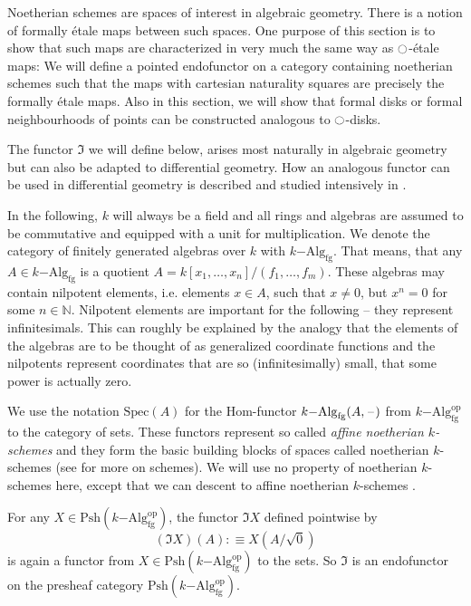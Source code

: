 \documentclass[9pt,twosided]{amsart}
\newcommand{\bN}{\mathbb N}
\newcommand{\Spec}{\ensuremath{\mathrm{Spec}}}
\begin{document}
Noetherian schemes are spaces of interest in algebraic geometry. There is a notion of formally étale maps between such spaces.
One purpose of this section is to show that such maps are characterized in very much the same way as ${\ocircle}$-étale maps:
We will define a pointed endofunctor on a category containing noetherian schemes
such that the maps with cartesian naturality squares are precisely the formally étale maps.
Also in this section, we will show that formal disks or formal neighbourhoods of points can be constructed analogous to ${\ocircle}$-disks.

The functor $\Im$ we will define below, arises most naturally in algebraic geometry but can also be adapted to differential geometry.
How an analogous functor can be used in differential geometry is described and studied intensively in \cite{SyntheticPDEs}.

In the following, $k$ will always be a field and all rings and algebras are assumed to be commutative and equipped with a unit for multiplication.
We denote the category of finitely generated algebras over $k$ with $k\mathrm{-Alg}_{\mathrm{fg}}$.
That means, that any $A\in k\mathrm{-Alg}_{\mathrm{fg}}$ is a quotient $A=k[x_1,\dots,x_n]/(f_1,\dots,f_m)$.
These algebras may contain nilpotent elements, i.e. elements $x\in A$, such that $x\neq 0$, but $x^n=0$ for some $n\in\bN$.
Nilpotent elements are important for the following -- they represent infinitesimals.
This can roughly be explained by the analogy
that the elements of the algebras are to be thought of as generalized coordinate functions
and the nilpotents represent coordinates that are so (infinitesimally) small, that some power is actually zero. 

We use the notation $\Spec(A)$ for the Hom-functor $k\mathrm{-Alg}_{\mathrm{fg}}(A,\mathord{\hspace{1pt}\text{--}\hspace{1pt}})$ from $k\mathrm{-Alg}^{\mathrm{op}}_{\mathrm{fg}}$ to the category of sets.
These functors represent so called \emph{affine noetherian $k$-schemes} and they form the basic building blocks of spaces called noetherian $k$-schemes
(see \cite[Chapter II]{hartshorne} for more on schemes).
We will use no property of noetherian $k$-schemes here,
except that we can descent to affine noetherian $k$-schemes .

For any $X\in\mathrm{Psh}(k\mathrm{-Alg}^\mathrm{op}_{\mathrm{fg}})$,
the functor $\Im X$ defined pointwise by
\[ (\Im X)(A):\equiv X(A/\sqrt{0})\]
is again a functor from $X\in\mathrm{Psh}(k\mathrm{-Alg}^\mathrm{op}_{\mathrm{fg}})$ to the sets.
So $\Im$ is an endofunctor on the presheaf category $\mathrm{Psh}(k\mathrm{-Alg}^\mathrm{op}_{\mathrm{fg}})$.
\end{document}
